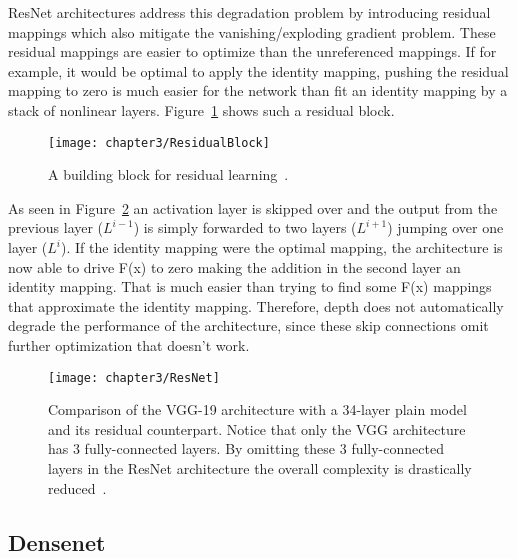 ResNet architectures address this degradation problem by introducing residual mappings which also mitigate the vanishing/exploding gradient problem. These residual mappings are easier to optimize than the unreferenced mappings. If for example, it would be optimal to apply the identity mapping, pushing the residual mapping to zero is much easier for the network than fit an identity mapping by a stack of nonlinear layers. Figure~\ref{fig:ResidualBlock} shows such a residual block.\\


\begin{figure}[!h]
  \centering
  \caption{A building block for residual learning~\cite{he2016deep}.}
  \texttt{[image: chapter3/ResidualBlock]}
  \label{fig:ResidualBlock}
\end{figure}

\quad

As seen in Figure~\ref{fig:ResNet} an activation layer is skipped over and the output from the previous layer ($L^{i-1}$) is simply forwarded to two layers ($L^{i+1}$) jumping over one layer ($L^{i}$). If the identity mapping were the optimal mapping, the architecture is now able to drive F(x) to zero making the addition in the second layer an identity mapping. That is much easier than trying to find some F(x) mappings that approximate the identity mapping. Therefore, depth does not automatically degrade the performance of the architecture, since these skip connections omit further optimization that doesn't work.\\


\begin{figure}[!h]
  \centering
  \caption{Comparison of the VGG-19 architecture with a 34-layer plain model and its residual counterpart. Notice that only the VGG architecture has 3 fully-connected layers. By omitting these 3 fully-connected layers in the ResNet architecture the overall complexity is drastically reduced~\cite{he2016deep}.}
  \texttt{[image: chapter3/ResNet]}
  \label{fig:ResNet}
\end{figure}

\quad

\subsection{Densenet}

